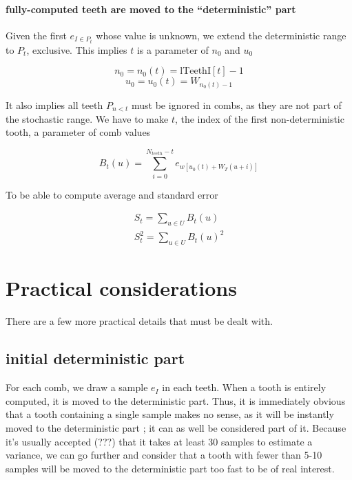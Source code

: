 \documentclass[./thesis.tex]{subfiles}
\newcommand{\lTeethI}{\text{lTeethI}}
\begin{document}
\paragraph{fully-computed teeth are moved to the ``deterministic'' part}
Given the first $e_{I \in P_t}$ whose value is unknown, we extend the deterministic range to $P_t$, exclusive. This implies $t$ is a parameter of $n_0$ and $u_0$

\begin{equation}
n_0 = n_0(t) = \lTeethI[t]-1
\end{equation}
\begin{equation}
u_0 = u_0(t) = W_{n_0(t) -1}
\end{equation}

It also implies all teeth $P_{n<t}$ must be ignored in combs, as they are not part of the stochastic range. We have to make $t$, the index of the first non-deterministic tooth, a parameter of comb values

\begin{equation}
B_t(u) = \sum_{i=0}^{N_{teeth}-t} e_{w[u_0(t)+ W_T(u+i)]}
\end{equation}

To be able to compute average and standard error 

\begin{align}
 S_t = \sum_{u \in {U}} B_t(u) \\
 S^2_t = \sum_{u \in {U}} B_t(u)^2
\end{align}


\section{Practical considerations}

There are a few more practical details that must be dealt with.

\subsection*{initial deterministic part}

For each comb, we draw a sample $e_I$ in each teeth. When a tooth is entirely computed, it is moved to the deterministic part. Thus, it is immediately obvious that a tooth containing a single sample makes no sense, as it will be instantly moved to the deterministic part ; it can as well be considered part of it. Because it's usually accepted (???) that it takes at least 30 samples to estimate a variance, we can go further and consider that a tooth with fewer than 5-10 samples will be moved to the deterministic part too fast to be of real interest.
\end{document}
